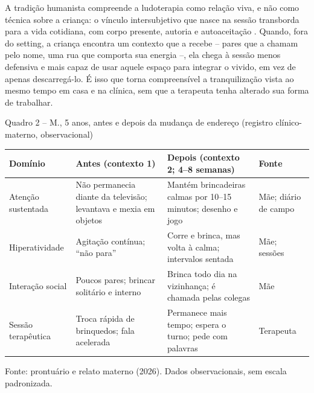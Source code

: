 A tradi\c{c}\~ao humanista compreende a ludoterapia como rela\c{c}\~ao viva, e n\~ao como t\'ecnica sobre a crian\c{c}a: o v\'inculo intersubjetivo que nasce na sess\~ao transborda para a vida cotidiana, com corpo presente, autoria e autoaceita\c{c}\~ao \cite{axline1984,rogers2020}. Quando, fora do setting, a crian\c{c}a encontra um contexto que a recebe -- pares que a chamam pelo nome, uma rua que comporta sua energia --, ela chega \`a sess\~ao menos defensiva e mais capaz de usar aquele espa\c{c}o para integrar o vivido, em vez de apenas descarreg\'a-lo. \'E isso que torna compreens\'ivel a tranquiliza\c{c}\~ao vista ao mesmo tempo em casa e na cl\'inica, sem que a terapeuta tenha alterado sua forma de trabalhar.

\begin{quadro}{Quadro 2 -- M., 5 anos, antes e depois da mudan\c{c}a de endere\c{c}o (registro cl\'inico-materno, observacional)}
\renewcommand{\arraystretch}{1.25}
\begin{tabular}{p{3.4cm} p{4.4cm} p{4.4cm} p{2.2cm}}
\toprule
\textbf{Dom\'inio} & \textbf{Antes (contexto 1)} & \textbf{Depois (contexto 2; 4--8 semanas)} & \textbf{Fonte} \\
\midrule
Aten\c{c}\~ao sustentada & N\~ao permanecia diante da televis\~ao; levantava e mexia em objetos & Mant\'em brincadeiras calmas por 10--15 minutos; desenho e jogo & M\~ae; di\'ario de campo \\
Hiperatividade & Agita\c{c}\~ao cont\'inua; ``n\~ao para'' & Corre e brinca, mas volta \`a calma; intervalos sentada & M\~ae; sess\~oes \\
Intera\c{c}\~ao social & Poucos pares; brincar solit\'ario e interno & Brinca todo dia na vizinhan\c{c}a; \'e chamada pelas colegas & M\~ae \\
Sess\~ao terap\^eutica & Troca r\'apida de brinquedos; fala acelerada & Permanece mais tempo; espera o turno; pede com palavras & Terapeuta \\
\bottomrule
\end{tabular}
\par\smallskip
{Fonte: prontu\'ario e relato materno (2026). Dados observacionais, sem escala padronizada.}
\end{quadro}
